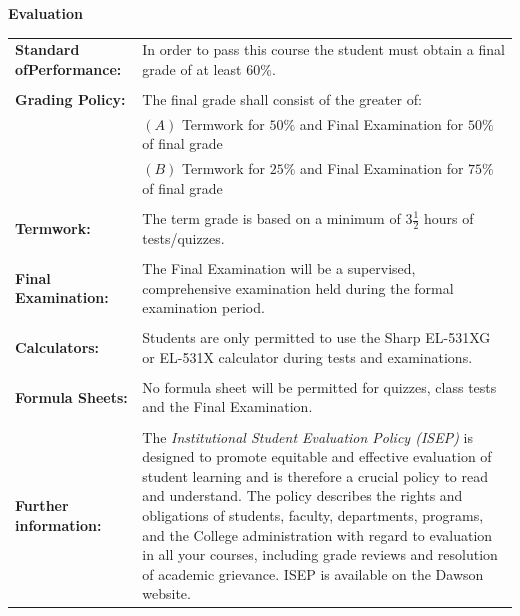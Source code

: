 \documentclass[10pt]{article}
\begin{document}
\large{\textbf{Evaluation}}\\
\vspace{-0.15in}\hline \bigskip \normalsize
\begin{tabular}{@{}p{1.5in}p{4.7in}}
\textbf{Standard of\newline Performance:}& In order to pass this course the student must obtain a final grade of at least $60\%$.\\\\
\textbf{Grading Policy:}  	&  The final grade shall consist of the greater of:\\
				& $(A)$ Termwork for $50\%$ and Final Examination for $50\%$ of final grade\\
				& $(B)$ Termwork for $25\%$ and Final Examination for $75\%$ of final grade\\ \\
\textbf{Termwork:} &
The term grade is based on a minimum of $3\frac12$ hours of tests/quizzes.\\\\
\textbf{Final Examination:} & The Final Examination will be a supervised, comprehensive examination held during the formal examination period.\\\\
\textbf{Calculators:}		& Students are only permitted to use the Sharp EL-531XG or EL-531X calculator during tests and examinations.\\\\
\textbf{Formula Sheets:}	& No formula sheet will be permitted for quizzes, class tests and the Final Examination.\\\\
\textbf{Further information:} & The \textit{Institutional Student Evaluation Policy (ISEP)} is designed to promote equitable and effective
evaluation of student learning and is therefore a crucial policy to read and understand. The policy
describes the rights and obligations of students, faculty, departments, programs, and the College
administration with regard to evaluation in all your courses, including grade reviews and resolution of
academic grievance. ISEP is available on the Dawson website.
\end{tabular}

\vspace*{\fill}

\newpage
\vspace*{\fill}
\end{document}
